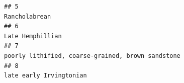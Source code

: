 \documentclass[]{article}
\begin{document}
\begin{verbatim}
## 5                                                                                                                                                                                                                                                                                                                                                                                                                                                                                                                                                                                                                                                                                     Rancholabrean
## 6                                                                                                                                                                                                                                                                                                                                                                                                                                                                                                                                                                                                                                                                                  Late Hemphillian
## 7                                                                                                                                                                                                                                                                                                                                                                                                                                                                                                                                                                                                                                                 poorly lithified, coarse-grained, brown sandstone
## 8                                                                                                                                                                                                                                                                                                                                                                                                                                                                                                                                                                                                                                                                           late early Irvingtonian

\end{verbatim}
\end{document}
